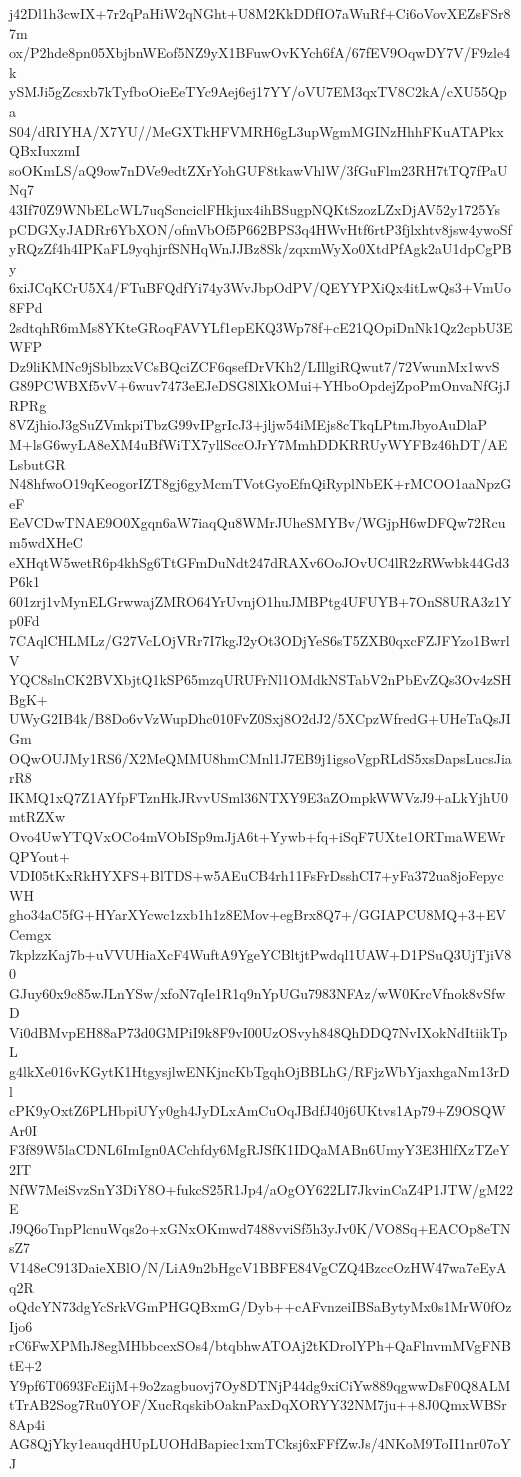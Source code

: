 j42Dl1h3cwIX+7r2qPaHiW2qNGht+U8M2KkDDfIO7aWuRf+Ci6oVovXEZsFSr87m
ox/P2hde8pn05XbjbnWEof5NZ9yX1BFuwOvKYch6fA/67fEV9OqwDY7V/F9zle4k
ySMJi5gZcsxb7kTyfboOieEeTYc9Aej6ej17YY/oVU7EM3qxTV8C2kA/cXU55Qpa
S04/dRIYHA/X7YU//MeGXTkHFVMRH6gL3upWgmMGINzHhhFKuATAPkxQBxIuxzmI
soOKmLS/aQ9ow7nDVe9edtZXrYohGUF8tkawVhlW/3fGuFlm23RH7tTQ7fPaUNq7
43If70Z9WNbELcWL7uqScnciclFHkjux4ihBSugpNQKtSzozLZxDjAV52y1725Ys
pCDGXyJADRr6YbXON/ofmVbOf5P662BPS3q4HWvHtf6rtP3fjlxhtv8jsw4ywoSf
yRQzZf4h4IPKaFL9yqhjrfSNHqWnJJBz8Sk/zqxmWyXo0XtdPfAgk2aU1dpCgPBy
6xiJCqKCrU5X4/FTuBFQdfYi74y3WvJbpOdPV/QEYYPXiQx4itLwQs3+VmUo8FPd
2sdtqhR6mMs8YKteGRoqFAVYLf1epEKQ3Wp78f+cE21QOpiDnNk1Qz2cpbU3EWFP
Dz9liKMNc9jSblbzxVCsBQciZCF6qsefDrVKh2/LIllgiRQwut7/72VwunMx1wvS
G89PCWBXf5vV+6wuv7473eEJeDSG8lXkOMui+YHboOpdejZpoPmOnvaNfGjJRPRg
8VZjhioJ3gSuZVmkpiTbzG99vIPgrIcJ3+jljw54iMEjs8cTkqLPtmJbyoAuDlaP
M+lsG6wyLA8eXM4uBfWiTX7yllSccOJrY7MmhDDKRRUyWYFBz46hDT/AELsbutGR
N48hfwoO19qKeogorIZT8gj6gyMcmTVotGyoEfnQiRyplNbEK+rMCOO1aaNpzGeF
EeVCDwTNAE9O0Xgqn6aW7iaqQu8WMrJUheSMYBv/WGjpH6wDFQw72Rcum5wdXHeC
eXHqtW5wetR6p4khSg6TtGFmDuNdt247dRAXv6OoJOvUC4lR2zRWwbk44Gd3P6k1
601zrj1vMynELGrwwajZMRO64YrUvnjO1huJMBPtg4UFUYB+7OnS8URA3z1Yp0Fd
7CAqlCHLMLz/G27VcLOjVRr7I7kgJ2yOt3ODjYeS6sT5ZXB0qxcFZJFYzo1BwrlV
YQC8slnCK2BVXbjtQ1kSP65mzqURUFrNl1OMdkNSTabV2nPbEvZQs3Ov4zSHBgK+
UWyG2IB4k/B8Do6vVzWupDhc010FvZ0Sxj8O2dJ2/5XCpzWfredG+UHeTaQsJIGm
OQwOUJMy1RS6/X2MeQMMU8hmCMnl1J7EB9j1igsoVgpRLdS5xsDapsLucsJiarR8
IKMQ1xQ7Z1AYfpFTznHkJRvvUSml36NTXY9E3aZOmpkWWVzJ9+aLkYjhU0mtRZXw
Ovo4UwYTQVxOCo4mVObISp9mJjA6t+Yywb+fq+iSqF7UXte1ORTmaWEWrQPYout+
VDI05tKxRkHYXFS+BlTDS+w5AEuCB4rh11FsFrDsshCI7+yFa372ua8joFepycWH
gho34aC5fG+HYarXYcwc1zxb1h1z8EMov+egBrx8Q7+/GGIAPCU8MQ+3+EVCemgx
7kplzzKaj7b+uVVUHiaXcF4WuftA9YgeYCBltjtPwdql1UAW+D1PSuQ3UjTjiV80
GJuy60x9c85wJLnYSw/xfoN7qIe1R1q9nYpUGu7983NFAz/wW0KrcVfnok8vSfwD
Vi0dBMvpEH88aP73d0GMPiI9k8F9vI00UzOSvyh848QhDDQ7NvIXokNdItiikTpL
g4lkXe016vKGytK1HtgysjlwENKjncKbTgqhOjBBLhG/RFjzWbYjaxhgaNm13rDl
cPK9yOxtZ6PLHbpiUYy0gh4JyDLxAmCuOqJBdfJ40j6UKtvs1Ap79+Z9OSQWAr0I
F3f89W5laCDNL6ImIgn0ACchfdy6MgRJSfK1IDQaMABn6UmyY3E3HlfXzTZeY2IT
NfW7MeiSvzSnY3DiY8O+fukcS25R1Jp4/aOgOY622LI7JkvinCaZ4P1JTW/gM22E
J9Q6oTnpPlcnuWqs2o+xGNxOKmwd7488vviSf5h3yJv0K/VO8Sq+EACOp8eTNsZ7
V148eC913DaieXBlO/N/LiA9n2bHgcV1BBFE84VgCZQ4BzccOzHW47wa7eEyAq2R
oQdcYN73dgYcSrkVGmPHGQBxmG/Dyb++cAFvnzeiIBSaBytyMx0s1MrW0fOzIjo6
rC6FwXPMhJ8egMHbbcexSOs4/btqbhwATOAj2tKDrolYPh+QaFlnvmMVgFNBtE+2
Y9pf6T0693FcEijM+9o2zagbuovj7Oy8DTNjP44dg9xiCiYw889qgwwDsF0Q8ALM
tTrAB2Sog7Ru0YOF/XucRqskibOaknPaxDqXORYY32NM7ju++8J0QmxWBSr8Ap4i
AG8QjYky1eauqdHUpLUOHdBapiec1xmTCksj6xFFfZwJs/4NKoM9ToII1nr07oYJ
